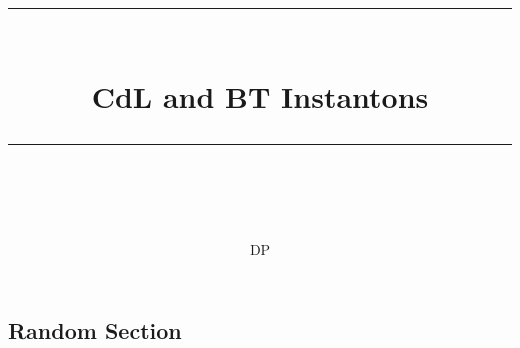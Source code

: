 \documentclass[11pt, a4paper]{article} %
\title{	
	\normalfont\normalsize
	\textsc{}\\ %
	\vspace{5pt} %
	\rule{\linewidth}{0.2pt}\\ %
	\vspace{10pt} %
	{\huge CdL and BT Instantons}\\ %
	\vspace{5pt} %
	\rule{\linewidth}{-2pt}\\ %
	\vspace{-25pt} %
	\date{}
}
\author{DP}
\begin{document}
\maketitle 




\subsection*{Random Section}

\cite{Danielsson:2018ztv}







\end{document}
